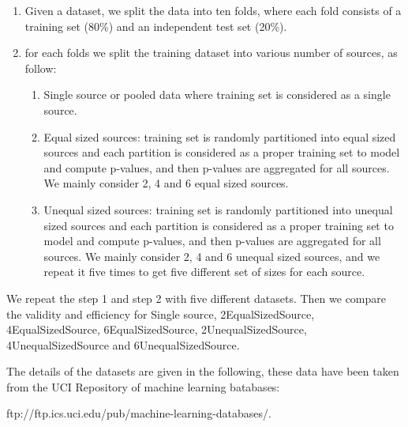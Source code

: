 \documentclass[main]{subfiles}
\begin{document}
\begin{enumerate}

\item Given a dataset, we split the data into ten folds, where each fold consists of a training set (80\%) and an independent test set (20\%).

\item for each folds we split the training dataset into various number of sources, as follow:
\begin{enumerate}
	\item Single source or pooled data  where training set is considered as a single source.
	\item Equal sized sources: training set is randomly partitioned into equal sized sources and  each partition is considered as a proper training set to model and compute p-values, and then p-values are aggregated for all sources. We mainly consider 2, 4 and 6 equal sized sources. %
	\item Unequal sized sources: training set is randomly partitioned into unequal sized sources and  each partition is considered as a proper training set to model and compute p-values, and then p-values are aggregated for all sources. We mainly consider 2, 4 and 6 unequal sized sources, and we repeat it five times to get five different set of sizes for each source.
\end{enumerate}

\end{enumerate}

We repeat the step 1 and step 2 with five different datasets. Then we compare the validity and efficiency for Single source, 2EqualSizedSource, 4EqualSizedSource, 6EqualSizedSource, 2UnequalSizedSource, 4UnequalSizedSource and 6UnequalSizedSource. 

The details of the datasets are given in the following, these data have been taken from the UCI Repository of machine learning batabases: 

ftp://ftp.ics.uci.edu/pub/machine-learning-databases/.
\newpage
\end{document}
